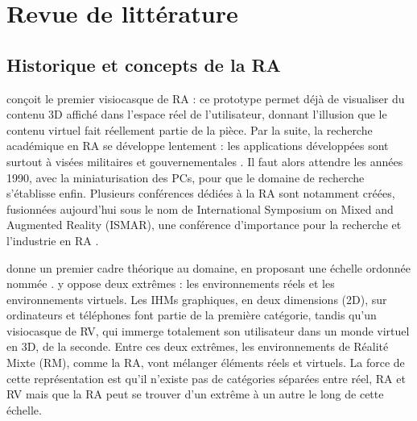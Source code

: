 \chapter{Revue de littérature}
\label{ch:litterature}

\section{Historique et concepts de la RA}
\label{sec:litterature_ar_presentation}

\cite{Sutherland1968} conçoit le premier visiocasque de RA  : ce prototype permet déjà de visualiser du contenu 3D affiché dans l'espace réel de l'utilisateur, donnant l'illusion que le contenu virtuel fait réellement partie de la pièce. Par la suite, la recherche académique en RA se développe lentement : les applications développées sont surtout à visées militaires et gouvernementales \citep{VanKrevelen2010}. Il faut alors attendre les années 1990, avec la miniaturisation des PCs, pour que le domaine de recherche s'établisse enfin. Plusieurs conférences dédiées à la RA sont notamment créées, fusionnées aujourd'hui sous le nom de International Symposium on Mixed and Augmented Reality (ISMAR), une conférence d'importance pour la recherche et l'industrie en RA \citep{Azuma2001}.


\cite{Milgram1994} donne un premier cadre théorique au domaine, en proposant une échelle ordonnée nommée  . \citeauthor{Milgram1994} y oppose deux extrêmes : les environnements réels et les environnements virtuels. Les IHMs graphiques, en deux dimensions (2D), sur ordinateurs et téléphones font partie de la première catégorie, tandis qu'un visiocasque de RV, qui immerge totalement son utilisateur dans un monde virtuel en 3D, de la seconde. Entre ces deux extrêmes, les environnements de Réalité Mixte (RM), comme la RA, vont mélanger éléments réels et virtuels. La force de cette représentation est qu'il n'existe pas de catégories séparées entre réel, RA et RV mais que la RA peut se trouver d'un extrême à un autre le long de cette échelle.

